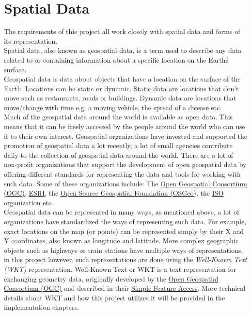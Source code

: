 \pagebreak
\section{Spatial Data}
The requirements of this project all work closely with spatial data and forms of its representation.\\
\newline
Spatial data, also known as geospatial data, is a term used to describe any data related to or containing information
about a specific location on the Earth\'s surface. \cite{AboutGeoSpatialData}\\
\newline
Geospatial data is data about objects that have a location on the surface of the Earth.
Locations can be static or dynamic. Static data are locations that don't move such as restaurants, roads or buildings.
Dynamic data are locations that move/change with time e.g. a moving vehicle, the spread of a disease etc.\\
\newline
Much of the geospatial data around the world is available as open data. This means that it can be freely accessed by the people
around the world who can use it to their own interest. Geospatial organizations have invested and supported the promotion of
geospatial data a lot recently, a lot of small agencies contribute daily to the collection of geospatial data around the world.
There are a lot of non-profit organizations that support the development of open geospatial data by offering different standards
for representing the data and tools for working with such data. Some of these organizations include: The \href{https://www.ogc.org/}{Open Geospatial Consortium (OGC)},
\href{https://www.esri.com/en-us/home}{ESRI}, the \href{https://www.osgeo.org/}{Open Source Geospatial Foundation (OSGeo)},
the \href{https://www.iso.org/home.html}{ISO organization} etc.\\
\newline
Geospatial data can be represented in many ways, as mentioned above, a lot of organizations have standardized the ways of representing
such data. For example, exact locations on the map (or points) can be represented simply by their X and Y coordinates, also known as longitude and latitude.
More complex geographic objects such as highways or train stations have multiple ways of representations, in this project however, such representations
are done using the \textit{Well-Known Text (WKT)} representation. Well-Known Text or WKT is a text representation for exchanging geometry data, originally developed by
the \href{https://www.ogc.org/}{Open Geospatial Consortium (OGC)} and described in their \href{https://www.ogc.org/standards/sfa#overview}{Simple Feature Access}.
More technical details about WKT and how this project utilizes it will be provided in the implementation chapters.\\
\newline
\pagebreak
